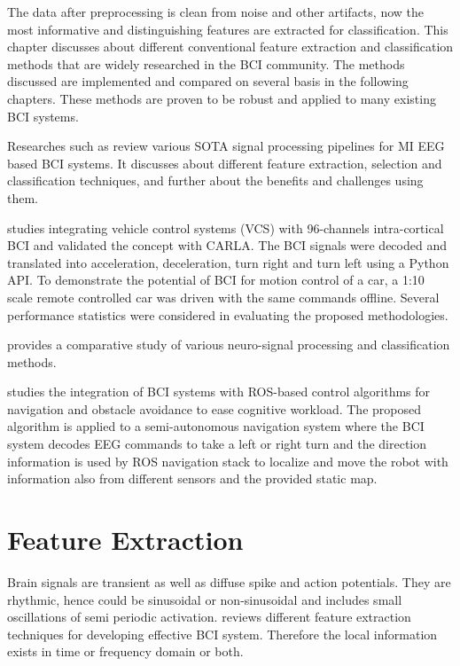 The data after preprocessing is clean from noise and other artifacts, now the most informative and distinguishing features are extracted for classification. This chapter discusses about different conventional feature extraction and classification methods that are widely researched in the BCI community. The methods discussed are implemented and compared on several basis in the following chapters. These methods are proven to be robust and applied to many existing BCI systems.

Researches such as \cite{2019_BMI_MIEEG} review various SOTA  signal processing pipelines for MI EEG based BCI systems. It discusses about different feature extraction, selection and classification techniques, and further about the benefits and challenges using them. 

\cite{2019_BMI_CARLA} studies integrating vehicle control systems (VCS) with 96-channels intra-cortical BCI and validated the concept with CARLA. The BCI signals were decoded and translated into acceleration, deceleration, turn right and turn left using a Python API. To demonstrate the potential of BCI for motion control of a car, a 1:10 scale remote controlled car was driven with the same commands offline. Several performance statistics were considered in evaluating the proposed methodologies.

\cite{2020_SP_comparison} provides a comparative study of various neuro-signal processing and classification methods.

\cite{2019_BCI_ROS} studies the integration of BCI systems with ROS-based control algorithms for navigation and obstacle avoidance to ease cognitive workload. The proposed algorithm is applied to a semi-autonomous navigation system where the BCI system decodes EEG commands to take a left or right turn and the direction information is used by ROS navigation stack to localize and move the robot with information also from different sensors and the provided static map.

\section{Feature Extraction} \label{feat_ext}
Brain signals are transient as well as diffuse spike and action potentials. They are rhythmic, hence could be sinusoidal or non-sinusoidal and includes small oscillations of semi periodic activation. \cite{2020_FeatExt_Review} reviews different feature extraction techniques for developing effective BCI system. Therefore the local information exists in time or frequency domain or both. \par

